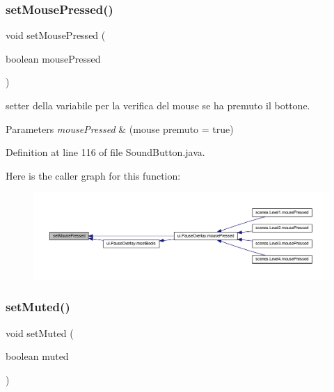 \subsubsection{\texorpdfstring{set\+Mouse\+Pressed()}{setMousePressed()}}
{\footnotesize\ttfamily void set\+Mouse\+Pressed (\begin{DoxyParamCaption}\item[{boolean}]{mouse\+Pressed }\end{DoxyParamCaption})}



setter della variabile per la verifica del mouse se ha premuto il bottone. 


\begin{DoxyParams}{Parameters}
{\em mouse\+Pressed} & (mouse premuto = true) \\
\hline
\end{DoxyParams}


Definition at line 116 of file Sound\+Button.\+java.

Here is the caller graph for this function\+:\nopagebreak
\begin{figure}[H]
\begin{center}
\leavevmode
\includegraphics[width=350pt]{classui_1_1_sound_button_ad6f3328519bbc954f7973bc885d088d8_icgraph}
\end{center}
\end{figure}
\mbox{\label{classui_1_1_sound_button_a9dfe6f9f7337d35cf2e6624259b72134}} 
\subsubsection{\texorpdfstring{set\+Muted()}{setMuted()}}
{\footnotesize\ttfamily void set\+Muted (\begin{DoxyParamCaption}\item[{boolean}]{muted }\end{DoxyParamCaption})}




